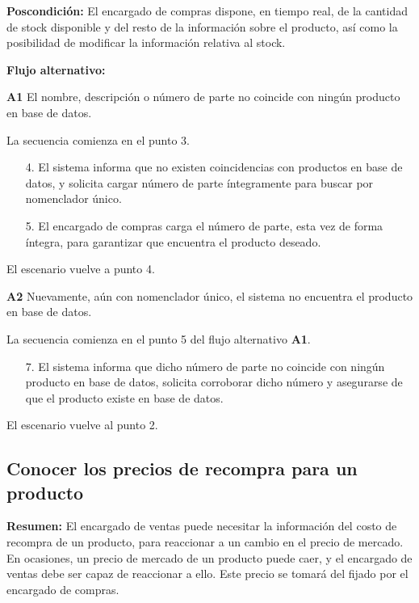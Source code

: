 \textbf{Poscondición:}
El encargado de compras dispone, en tiempo real,
de la cantidad de stock disponible
y del resto de la información sobre el producto,
así como la posibilidad de modificar la información relativa al stock.

\textbf{Flujo alternativo:}

\textbf{A1} El nombre, descripción o número de parte no coincide con ningún producto en base de datos.

La secuencia comienza en el punto 3.

\begin{enumerate}
	\item[4.] El sistema informa que no existen coincidencias con productos en base de datos,
	y solicita cargar número de parte íntegramente para buscar por nomenclador único.
	\item[5.] El encargado de compras carga el número de parte, esta vez de forma íntegra,
	para garantizar que encuentra el producto deseado.
\end{enumerate}

El escenario vuelve a punto 4.

\textbf{A2} Nuevamente, aún con nomenclador único, el sistema no encuentra el producto en base de datos.

La secuencia comienza en el punto 5 del flujo alternativo \textbf{A1}.

\begin{enumerate}
	\item [7.] El sistema informa que dicho número de parte no coincide con ningún producto en base de datos, 
	solicita corroborar dicho número y asegurarse de que el producto existe en base de datos.
\end{enumerate}

El escenario vuelve al punto 2.

\pagebreak

\subsection{Conocer los precios de recompra para un producto}
 
\textbf{Resumen:}
El encargado de ventas puede necesitar la información del costo de recompra de un producto,
para reaccionar a un cambio en el precio de mercado.
En ocasiones, un precio de mercado de un producto puede caer,
y el encargado de ventas debe ser capaz de reaccionar a ello.
Este precio se tomará del fijado por el encargado de compras.

